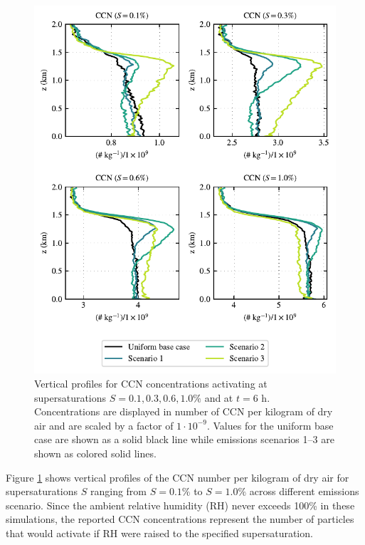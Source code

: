 \documentclass[journal abbreviation, manuscript]{copernicus}
\begin{document}
\begin{figure}[!h]
	\centering
	\includegraphics[]{figures/aerosol-ccn-vertical-profiles-time36.pdf}
	\caption{Vertical profiles for CCN concentrations activating
          at supersaturations $S=0.1, 0.3, 0.6, 1.0\%$ and at $t=6$
          h. Concentrations are displayed in number of CCN per
          kilogram of dry air and are scaled by a factor of
          $1\cdot10^{-9}$. Values for the uniform base case are shown
          as a solid black line while emissions scenarios 1--3 are
          shown as colored solid lines.}
	\label{fig:ccn-vertical-prof}
\end{figure} 

Figure \ref{fig:ccn-vertical-prof} shows vertical profiles of the CCN 
number per kilogram of dry air for 
supersaturations $S$ ranging from $S=0.1\%$ to $S=1.0\%$ across
different emissions scenario. Since the ambient relative humidity (RH)
never exceeds 100\% in these simulations, the reported CCN
concentrations represent the number of particles that would activate
if RH were raised to the specified supersaturation.
\end{document}
